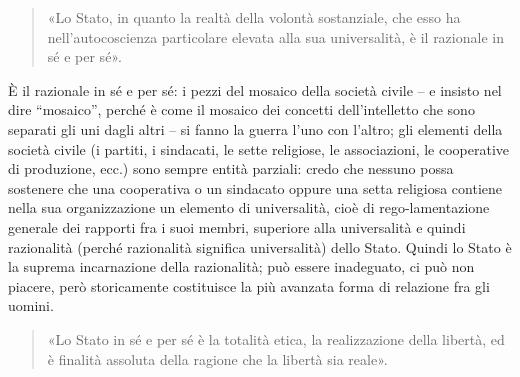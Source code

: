 \documentclass[a4paper,12pt,oneside,openany]{book}%
\begin{document}
\begin{quotation}
	«Lo Stato, in quanto la realtà della volontà sostanziale, che esso ha nell’autocoscienza particolare elevata alla sua universalità, è il razionale in sé e per sé».

\end{quotation}
È il razionale in sé e per sé: i pezzi del mosaico della società civile
– e insisto nel dire “mosaico”, perché è come il mosaico dei concetti dell’intelletto che sono separati gli uni dagli altri – si fanno la guerra l’uno con l’altro; gli elementi della società civile (i partiti, i sindacati, le sette religiose, le associazioni, le cooperative di produzione, ecc.) sono sempre entità parziali: credo che nessuno possa sostenere che una cooperativa o un sindacato oppure una setta religiosa contiene nella sua organizzazione un elemento di universalità, cioè di rego-lamentazione generale dei rapporti fra i suoi membri, superiore alla universalità e quindi razionalità (perché razionalità significa universalità) dello Stato. Quindi lo Stato è la suprema incarnazione della razionalità; può essere inadeguato, ci può non piacere, però storicamente costituisce la più avanzata forma di relazione fra gli uomini.

\begin{quotation}
	«Lo Stato in sé e per sé è la totalità etica, la realizzazione della libertà, ed è finalità assoluta della ragione che la libertà sia reale».
\end{quotation}
\end{document}
